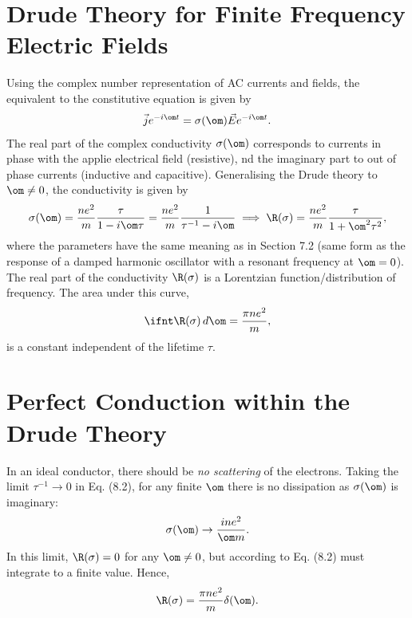\documentclass[qo.tex]{subfiles}
\begin{document}
\section{Drude Theory for Finite Frequency Electric Fields}
Using the complex number representation of AC currents and fields, the equivalent to the constitutive equation is given by
\begin{align}
    \vec{j}e^{-i\om t} = \sigma(\om)\vec{E}e^{-i\om t}.
\end{align}
The real part of the complex conductivity $\sigma(\om)$ corresponds to currents in phase with the applie electrical field (resistive), nd the imaginary part to out of phase currents (inductive and capacitive).
Generalising the Drude theory to $\om\neq0$, the conductivity is given by
\begin{align}
    \sigma(\om) = \frac{ne^2}{m}\frac{\tau}{1-i\om\tau} = \frac{ne^2}{m}\frac{1}{\tau^{-1}-i\om} \implies \R(\sigma) = \frac{ne^2}{m}\frac{\tau}{1+\om^2\tau^2},
\end{align}
where the parameters have the same meaning as in Section 7.2 (same form as the response of a damped harmonic oscillator with a resonant frequency at $\om=0$).
The real part of the conductivity $\R(\sigma)$ is a Lorentzian function/distribution of frequency.
The area under this curve,
\begin{align}
    \ifnt \R(\sigma)\,d\om = \frac{\pi ne^2}{m},
\end{align}
is a constant independent of the lifetime $\tau$.

\section{Perfect Conduction within the Drude Theory}
In an ideal conductor, there should be \emph{no scattering} of the electrons. 
Taking the limit $\tau^{-1}\to0$ in Eq. (8.2), for any finite $\om$ there is no dissipation as $\sigma(\om)$ is imaginary:
\begin{align}
    \sigma(\om) \to \frac{ine^2}{\om m}.
\end{align}
In this limit, $\R(\sigma)=0$ for any $\om\neq0$, but according to Eq. (8.2) must integrate to a finite value. 
Hence, 
\begin{align}
    \R(\sigma) = \frac{\pi ne^2}{m}\delta(\om).
\end{align}
\end{document}
